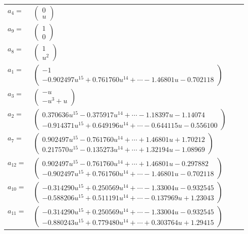 \documentclass[1p]{elsarticle_modified}
\theoremstyle{definition}
\begin{document}
\begin{tabular}{m{7pt} m{180pt} m{7pt} m{180pt} }
\flushright $a_{4}=$&$\begin{pmatrix}0\\u\end{pmatrix}$ \\
\flushright $a_{9}=$&$\begin{pmatrix}1\\0\end{pmatrix}$ \\
\flushright $a_{8}=$&$\begin{pmatrix}1\\u^2\end{pmatrix}$ \\
\flushright $a_{1}=$&$\begin{pmatrix}-1\\-0.902497 u^{15}+0.761760 u^{14}+\cdots-1.46801 u-0.702118\end{pmatrix}$ \\
\flushright $a_{3}=$&$\begin{pmatrix}- u\\- u^3+u\end{pmatrix}$ \\
\flushright $a_{2}=$&$\begin{pmatrix}0.370636 u^{15}-0.375917 u^{14}+\cdots-1.18397 u-1.14074\\-0.914371 u^{15}+0.649196 u^{14}+\cdots-0.644115 u-0.556100\end{pmatrix}$ \\
\flushright $a_{7}=$&$\begin{pmatrix}0.902497 u^{15}-0.761760 u^{14}+\cdots+1.46801 u+1.70212\\0.217570 u^{15}-0.135273 u^{14}+\cdots+1.32194 u-1.08969\end{pmatrix}$ \\
\flushright $a_{12}=$&$\begin{pmatrix}0.902497 u^{15}-0.761760 u^{14}+\cdots+1.46801 u-0.297882\\-0.902497 u^{15}+0.761760 u^{14}+\cdots-1.46801 u-0.702118\end{pmatrix}$ \\
\flushright $a_{10}=$&$\begin{pmatrix}-0.314290 u^{15}+0.250569 u^{14}+\cdots-1.33004 u-0.932545\\-0.588206 u^{15}+0.511191 u^{14}+\cdots-0.137969 u+1.23043\end{pmatrix}$ \\
\flushright $a_{11}=$&$\begin{pmatrix}-0.314290 u^{15}+0.250569 u^{14}+\cdots-1.33004 u-0.932545\\-0.880243 u^{15}+0.779480 u^{14}+\cdots+0.303764 u+1.29415\end{pmatrix}$ \\

\end{tabular}
\end{document}
